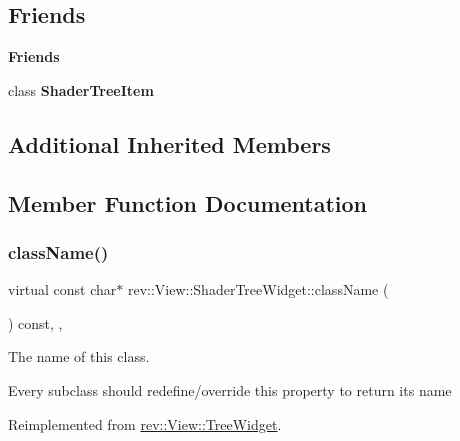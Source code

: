 \subsection*{Friends}
\begin{Indent}\textbf{ Friends}\par
\begin{DoxyCompactItemize}
\item 
\mbox{\label{classrev_1_1_view_1_1_shader_tree_widget_a091fc3a23a84de493506a433f7135f53}} 
class {\bfseries Shader\+Tree\+Item}
\end{DoxyCompactItemize}
\end{Indent}
\subsection*{Additional Inherited Members}


\subsection{Member Function Documentation}
\mbox{\label{classrev_1_1_view_1_1_shader_tree_widget_aac6c4858df27dfdf09a0694eeb5bccd4}} 
\subsubsection{\texorpdfstring{className()}{className()}}
{\footnotesize\ttfamily virtual const char$\ast$ rev\+::\+View\+::\+Shader\+Tree\+Widget\+::class\+Name (\begin{DoxyParamCaption}{ }\end{DoxyParamCaption}) const\hspace{0.3cm}{\ttfamily [inline]}, {\ttfamily [override]}, {\ttfamily [virtual]}}



The name of this class. 

Every subclass should redefine/override this property to return its name 

Reimplemented from \mbox{\hyperlink{classrev_1_1_view_1_1_tree_widget_aedde04f44badced7c60f0e1570e3d0b2}{rev\+::\+View\+::\+Tree\+Widget}}.

\mbox{\label{classrev_1_1_view_1_1_shader_tree_widget_a96c9912919772ee91f5d2fdd1dd89b33}} 
